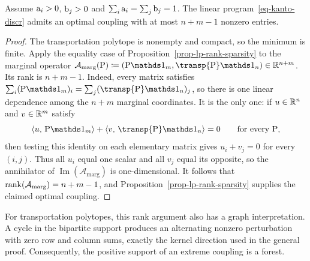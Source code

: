 \begin{prop}\label{prop-sparse-optimal-plans}
	Assume $\mathrm{a}_i>0$, $\mathrm{b}_j>0$ and $\sum_i \mathrm{a}_i=\sum_j \mathrm{b}_j=1$. The linear program~\eqref{eq-kanto-discr} admits an optimal coupling with at most $n+m-1$ nonzero entries.
\end{prop}
\begin{proof}
	The transportation polytope is nonempty and compact, so the minimum is finite. Apply the equality case of Proposition~\ref{prop-lp-rank-sparsity} to the marginal operator $\mathcal A_{\mathrm{marg}}(\P)\eqdef(\P\ones_m,\transp{\P}\ones_n)\in\RR^{n+m}$.
	Its rank is $n+m-1$. Indeed, every matrix satisfies
	$\sum_i(\P\ones_m)_i=\sum_j(\transp{\P}\ones_n)_j$, so there is one linear dependence among the $n+m$ marginal coordinates. It is the only one: if $u\in\mathbb{R}^n$ and $v\in\mathbb{R}^m$ satisfy
	\[
		\dotp{u}{\P\ones_m}
		+
		\dotp{v}{\transp{\P}\ones_n}=0
		\qquad\text{for every }\P,
	\]
	then testing this identity on each elementary matrix gives $u_i+v_j=0$ for every $(i,j)$. Thus all $u_i$ equal one scalar and all $v_j$ equal its opposite, so the annihilator of $\operatorname{Im}(\mathcal A_{\mathrm{marg}})$ is one-dimensional. It follows that $\operatorname{rank}(\mathcal A_{\mathrm{marg}})=n+m-1$, and Proposition~\ref{prop-lp-rank-sparsity} supplies the claimed optimal coupling.
\end{proof}

For transportation polytopes, this rank argument also has a graph interpretation. A cycle in the bipartite support produces an alternating nonzero perturbation with zero row and column sums, exactly the kernel direction used in the general proof. Consequently, the positive support of an extreme coupling is a forest.

